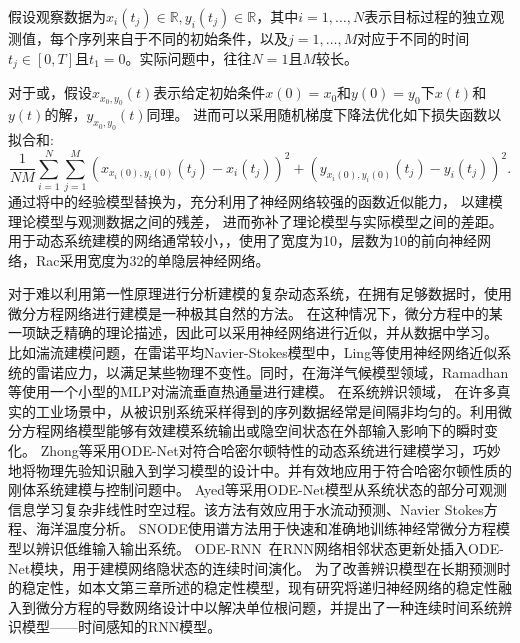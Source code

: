 假设观察数据为$x_i\left(t_j\right) \in \mathbb{R}, y_i\left(t_j\right) \in \mathbb{R}$，其中$i=1, \ldots, N$表示目标过程的独立观测值，每个序列来自于不同的初始条件，以及$j=1, \ldots, M$对应于不同的时间$t_j \in[0, T]$且$t_1=0$。实际问题中，往往$N=1$且$M$较长。

对于或，假设$x_{x_0, y_0}(t)$表示给定初始条件$x(0)=x_0$和$y(0)=y_0$下$x(t)$和$y(t)$的解，$y_{x_0, y_0}(t)$同理。
进而可以采用随机梯度下降法优化如下损失函数以拟合和:
\begin{equation}
    \frac{1}{N M} \sum_{i=1}^N \sum_{j=1}^M\left(x_{x_i(0), y_i(0)}\left(t_j\right)-x_i\left(t_j\right)\right)^2+\left(y_{x_i(0), y_i(0)}\left(t_j\right)-y_i\left(t_j\right)\right)^2 .
\end{equation}
通过将中的经验模型替换为，充分利用了神经网络较强的函数近似能力，
以建模理论模型与观测数据之间的残差，
进而弥补了理论模型与实际模型之间的差距。
用于动态系统建模的网络通常较小，\cite{ling2016reynolds}，使用了宽度为10，层数为10的前向神经网络，Rac采用宽度为32的单隐层神经网络。

对于难以利用第一性原理进行分析建模的复杂动态系统，在拥有足够数据时，使用微分方程网络进行建模是一种极其自然的方法。
在这种情况下，微分方程中的某一项缺乏精确的理论描述，因此可以采用神经网络进行近似，并从数据中学习。
比如湍流建模问题，在雷诺平均Navier-Stokes模型中，Ling等\cite{ling2016reynolds}使用神经网络近似系统的雷诺应力，以满足某些物理不变性。同时，在海洋气候模型领域，Ramadhan等\cite{ramadhan2020capturing}使用一个小型的MLP对湍流垂直热通量进行建模。
在系统辨识领域，
在许多真实的工业场景中，从被识别系统采样得到的序列数据经常是间隔非均匀的。利用微分方程网络模型能够有效建模系统输出或隐空间状态在外部输入影响下的瞬时变化。
Zhong等\cite{zhong2019symplectic}采用ODE-Net对符合哈密尔顿特性的动态系统进行建模学习，巧妙地将物理先验知识融入到学习模型的设计中。并有效地应用于符合哈密尔顿性质的刚体系统建模与控制问题中。
Ayed等\cite{ayed2019learning}采用ODE-Net模型从系统状态的部分可观测信息学习复杂非线性时空过程。该方法有效应用于水流动预测、Navier Stokes方程、海洋温度分析。
SNODE\cite{Quaglino2019}使用谱方法用于快速和准确地训练神经常微分方程模型以辨识低维输入输出系统。
ODE-RNN~\cite{Rubanova2019}在RNN网络相邻状态更新处插入ODE-Net模块，用于建模网络隐状态的连续时间演化。
为了改善辨识模型在长期预测时的稳定性，如本文第三章所述的稳定性模型，现有研究\cite{Demeester2019,Yuan2022}将递归神经网络的稳定性融入到微分方程的导数网络设计中以解决单位根问题，并提出了一种连续时间系统辨识模型——时间感知的RNN模型。



